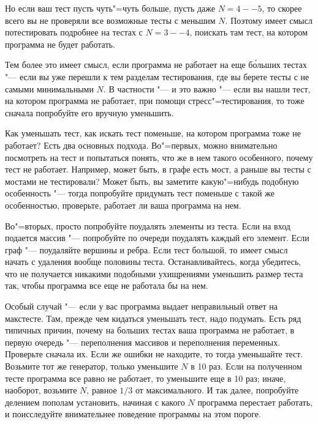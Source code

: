 \documentclass[a4paper,10pt]{problems}
\begin{document}
Но если ваш тест пусть чуть"=чуть больше, пусть даже $N=4--5$, то скорее всего вы не проверяли все возможные тесты с меньшим $N$. 
Поэтому имеет смысл потестировать подробнее на тестах с $N=3--4$, поискать там тест, на котором программа не будет работать.

Тем более это имеет смысл, если программа не работает на еще б\'{о}льших тестах "--- если вы уже перешли к тем разделам тестирования,
где вы берете тесты с не самыми минимальными $N$. 
В частности "--- и это важно "--- если вы нашли тест, на котором программа не работает, при помощи стресс"=тестирования,
то тоже сначала попробуйте его вручную уменьшить. 

Как уменьшать тест, как искать тест поменьше, на котором программа тоже не работает?
Есть два основных подхода. 
Во"=первых, можно внимательно посмотреть на тест и попытаться понять, что же в нем такого особенного, почему тест не работает. 
Например, может быть, в графе есть мост, а раньше вы тесты с мостами не тестировали? 
Может быть, вы заметите какую"=нибудь подобную особенность "--- тогда попробуйте придумать тест поменьше с такой же особенностью,
проверьте, работает ли ваша программа на нем.

Во"=вторых, просто попробуйте поудалять элементы из теста. Если на вход подается массив "--- попробуйте по очереди поудалять каждый его элемент.
Если граф "--- поудаляйте вершины и ребра. 
Если тест большой, то имеет смысл начать с удаления вообще половины теста.
Останавливайтесь, когда убедитесь, что не получается никакими подобными ухищрениями уменьшить размер теста так, чтобы программа все еще не работала бы на нем.

Особый случай "--- если у вас программа выдает неправильный ответ на макстесте. 
Там, прежде чем кидаться уменьшать тест, надо подумать. 
Есть ряд типичных причин, почему на больших тестах ваша программа не работает, в первую очередь "--- переполнения массивов и переполнения переменных.
Проверьте сначала их.
Если же ошибки не находите, то тогда уменьшайте тест. 
Возьмите тот же генератор, только уменьшите $N$ в 10 раз.
Если на полученном тесте программа все равно не работает, то уменьшите еще в 10 раз; иначе, наоборот, возьмите $N$, равное $1/3$ от максимального.
И так далее, попробуйте делением пополам установить, начиная с какого $N$ программа перестает работать, и поисследуйте внимательнее поведение программы
на этом пороге.
\end{document}
